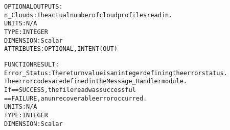 \begin{alltt}
  OPTIONAL OUTPUTS:
        n_Clouds:       The actual number of cloud profiles read in.
                        UNITS:      N/A
                        TYPE:       INTEGER
                        DIMENSION:  Scalar
                        ATTRIBUTES: OPTIONAL, INTENT(OUT)
 
  FUNCTION RESULT:
        Error_Status:   The return value is an integer defining the error status.
                        The error codes are defined in the Message_Handler module.
                        If == SUCCESS, the file read was successful
                           == FAILURE, an unrecoverable error occurred.
                        UNITS:      N/A
                        TYPE:       INTEGER
                        DIMENSION:  Scalar
 
  \end{alltt}
